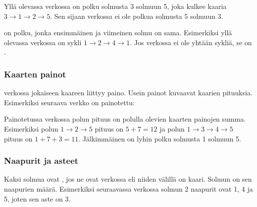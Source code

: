 Yllä olevassa verkossa on polku solmusta
3 solmuun 5, joka kulkee kaaria
$3 \rightarrow 1 \rightarrow 2 \rightarrow 5$.
Sen sijaan verkossa ei ole polkua
solmusta 5 solmuun 3.



 on polku, jonka ensimmäinen
ja viimeinen solmu on sama.
Esimerkiksi yllä olevassa verkossa on sykli
$1 \rightarrow 2 \rightarrow 4 \rightarrow 1$.
Jos verkossa ei ole yhtään sykliä, se on .

\subsubsection{Kaarten painot}


 verkossa
jokaiseen kaareen liittyy paino.
Usein painot kuvaavat kaarien pituuksia.
Esimerkiksi seuraava verkko on painotettu:
\begin{center}
\end{center}

Painotetussa verkossa polun pituus on 
polulla olevien kaarten painojen summa.
Esimerkiksi polun $1 \rightarrow 2 \rightarrow 5$
pituus on $5+7=12$ ja polun
$1 \rightarrow 3 \rightarrow 4 \rightarrow 5$ pituus on $1+7+3=11$.
Jälkimmäinen on lyhin polku solmusta 1 solmuun 5.

\subsubsection{Naapurit ja asteet}


Kaksi solmua ovat ,
jos ne ovat verkossa
 eli niiden välillä on kaari.
Solmun  on
sen naapurien määrä.
Esimerkiksi seuraavassa verkossa
solmun 2 naapurit ovat 1, 4 ja 5,
joten sen aste on 3.

